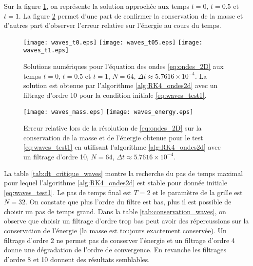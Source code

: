Sur la figure \ref{fig:waves_solution}, on représente la solution approchée aux temps $t=0$, $t=0.5$ et $t=1$. La figure \ref{fig:waves_conservation} permet d'une part de confirmer la conservation de la masse et d'autres part d'observer l'erreur relative sur l'énergie au cours du temps.
\begin{figure}[htbp]
\begin{center}
\texttt{[image: waves\_t0.eps]}
\texttt{[image: waves\_t05.eps]}
\texttt{[image: waves\_t1.eps]}
\end{center}
\caption{Solutions numériques pour l'équation des ondes \eqref{eq:ondes_2D} aux temps $t=0$, $t=0.5$ et $t=1$, $N=64$, $\Delta t \approx 5.7616\times10^{-4}$. La solution est obtenue par l'algorithme \ref{alg:RK4_ondes2d} avec un filtrage d'ordre 10 pour la condition initiale \eqref{eq:waves_test1}.}
\label{fig:waves_solution}
\end{figure}
\begin{figure}[htbp]
\begin{center}
\texttt{[image: waves\_mass.eps]}
\texttt{[image: waves\_energy.eps]}
\end{center}
\caption{Erreur relative lors de la résolution de \eqref{eq:ondes_2D} sur la conservation de la masse et de l'énergie obtenue pour le test \eqref{eq:waves_test1} en utilisant l'algorithme \ref{alg:RK4_ondes2d} avec un filtrage d'ordre 10, $N=64$, $\Delta t \approx 5.7616\times10^{-4}$.}
\label{fig:waves_conservation}
\end{figure}
La table \ref{tab:dt_critique_waves} montre la recherche du pas de temps maximal pour lequel l'algorithme \ref{alg:RK4_ondes2d} est stable pour donnée initiale \eqref{eq:waves_test1}. Le pas de temps final est $T=2$ et le paramètre de la grille est $N=32$. On constate que plus l'ordre du filtre est bas, plus il est possible de choisir un pas de temps grand. Dans la table \ref{tab:conservation_waves}, on observe que choisir un filtrage d'ordre trop bas peut avoir des répercussions sur la conservation de l'énergie (la masse est toujours exactement conservée). Un filtrage d'ordre 2 ne permet pas de conserver l'énergie et un filtrage d'ordre 4 donne une dégradation de l'ordre de convergence. En revanche les filtrages d'ordre 8 et 10 donnent des résultats semblables.

